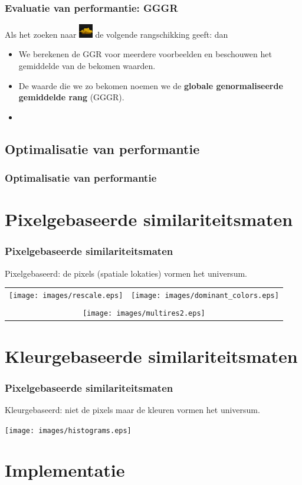 \documentclass[dutch]{beamer}
\theoremstyle{definition}
\theoremstyle{remark}
\theoremstyle{example}
\begin{document}
\frame
{
  \frametitle{Evaluatie van performantie: GGGR}

  Als het zoeken naar \includegraphics[width=0.6cm]{coil/beeld-12.eps} de volgende rangschikking geeft:
  dan

  \begin{itemize}
  \item We berekenen de GGR voor meerdere voorbeelden en beschouwen het 
  gemiddelde van de bekomen waarden. 
  \item De waarde die we zo bekomen noemen we de
  \textbf{globale genormaliseerde gemiddelde rang} (GGGR).
  \item 
  \end{itemize}
}
\subsection{Optimalisatie van performantie}
\frame
{
  \frametitle{Optimalisatie van performantie}
  
}

\section{Pixelgebaseerde similariteitsmaten}
\frame
{
  \frametitle{Pixelgebaseerde similariteitsmaten}

  Pixelgebaseerd: de pixels (spatiale lokaties) vormen het universum.

  \begin{center}
  \begin{tabular}{l@{$\qquad \qquad$}r}
  \texttt{[image: images/rescale.eps]} & 
  \texttt{[image: images/dominant\_colors.eps]} \\
  \\
  \multicolumn{2}{c}{\texttt{[image: images/multires2.eps]}}
  \end{tabular}
  \end{center}
}

\section{Kleurgebaseerde similariteitsmaten}
\frame
{
  \frametitle{Pixelgebaseerde similariteitsmaten}

  Kleurgebaseerd: niet de pixels maar de kleuren vormen het universum.

  \begin{center}
  \texttt{[image: images/histograms.eps]}
  \end{center}
}

\section{Implementatie}
\end{document}
